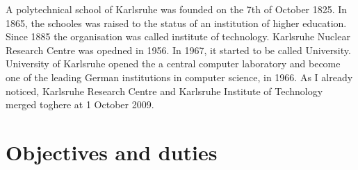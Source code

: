 \documentclass[english]{article}
\begin{document}
A polytechnical school of Karlsruhe was founded on the 7th of October 1825. In 1865, the schooles was raised to the status of an institution of higher education. Since 1885 the organisation was called institute of technology. Karlsruhe Nuclear Research Centre was opedned in 1956. In 1967, it started to be called University. \\

University of Karlsruhe opened the a central computer laboratory and become one of the leading German institutions in computer science, in 1966. As I already noticed, Karlsruhe Research Centre and Karlsruhe Institute of Technology merged toghere at 1 October 2009.

\section{Objectives and duties}
\end{document}
